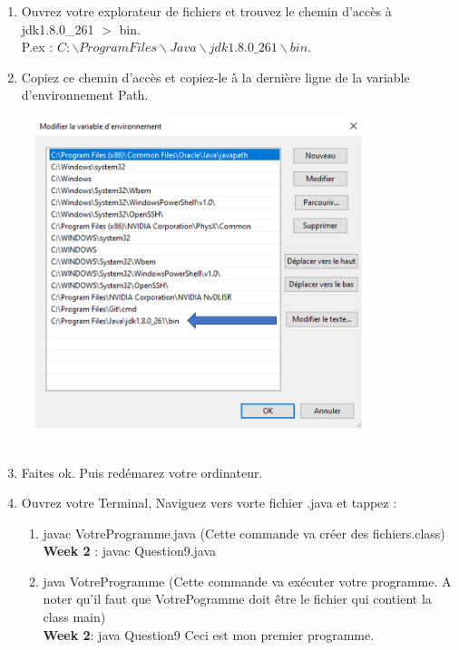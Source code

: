 \begin{enumerate}
    \item Ouvrez votre explorateur de fichiers et trouvez le chemin d'accès à jdk1.8.0\_261 $>$ bin. \\P.ex : $C:\backslash Program Files\backslash Java\backslash jdk1.8.0\_261\backslash bin.$\\
    \item Copiez ce chemin d'accès et copiez-le à la dernière ligne de la variable d'environnement Path.\\\
    \includegraphics[width = 10cm, height = 10cm]{img/Res3.PNG}\\
    \item Faites ok. Puis redémarez votre ordinateur.
    \item Ouvrez votre Terminal, Naviguez vers vorte fichier .java et tappez :
        \begin{enumerate}
            \item javac VotreProgramme.java (Cette commande va créer des fichiers.class)\\
            \textbf{Week 2} : javac Question9.java
            \item java VotreProgramme (Cette commande va exécuter votre programme. A noter qu'il faut que VotrePogramme doit être le fichier qui contient la class main)
            \\\textbf{Week 2}: java Question9 Ceci est mon premier programme.
        \end{enumerate}
    
\end{enumerate}



